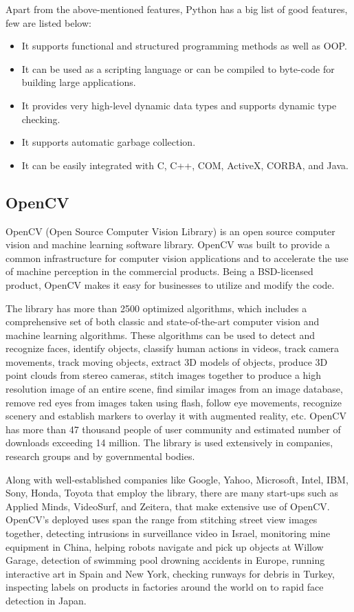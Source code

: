 Apart from the above-mentioned features, Python has a big list of good features, few are listed below:
\begin{itemize}
	\item It supports functional and structured programming methods as well as OOP.
\item It can be used as a scripting language or can be compiled to byte-code for building large applications.
\item It provides very high-level dynamic data types and supports dynamic type checking.
\item It supports automatic garbage collection.
\item It can be easily integrated with C, C++, COM, ActiveX, CORBA, and Java.

\end{itemize}
\subsection{OpenCV}
OpenCV (Open Source Computer Vision Library)\cite{opencv} is an open source computer vision and machine learning software library. OpenCV was built to provide a common infrastructure for computer vision applications and to accelerate the use of machine perception in the commercial products. Being a BSD-licensed product, OpenCV makes it easy for businesses to utilize and modify the code.\par
The library has more than 2500 optimized algorithms, which includes a comprehensive set of both classic and state-of-the-art computer vision and machine learning algorithms. These algorithms can be used to detect and recognize faces, identify objects, classify human actions in videos, track camera movements, track moving objects, extract 3D models of objects, produce 3D point clouds from stereo cameras, stitch images together to produce a high resolution image of an entire scene, find similar images from an image database, remove red eyes from images taken using flash, follow eye movements, recognize scenery and establish markers to overlay it with augmented reality, etc. OpenCV has more than 47 thousand people of user community and estimated number of downloads exceeding 14 million. The library is used extensively in companies, research groups and by governmental bodies.\par
Along with well-established companies like Google, Yahoo, Microsoft, Intel, IBM, Sony, Honda, Toyota that employ the library, there are many start-ups such as Applied Minds, VideoSurf, and Zeitera, that make extensive use of OpenCV. OpenCV’s deployed uses span the range from stitching street view images together, detecting intrusions in surveillance video in Israel, monitoring mine equipment in China, helping robots navigate and pick up objects at Willow Garage, detection of swimming pool drowning accidents in Europe, running interactive art in Spain and New York, checking runways for debris in Turkey, inspecting labels on products in factories around the world on to rapid face detection in Japan.\par
